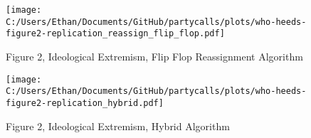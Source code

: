 \documentclass[12pt]{article}
\begin{document}
\begin{figure}[h]
	\caption{Figure 2, Ideological Extremism, Flip Flop Reassignment Algorithm}
	\centering
	\texttt{[image: C:/Users/Ethan/Documents/GitHub/partycalls/plots/who-heeds-figure2-replication\_reassign\_flip\_flop.pdf]}
	
\end{figure}

\begin{figure}[h]
	\caption{Figure 2, Ideological Extremism, Hybrid Algorithm}
	\centering
	\texttt{[image: C:/Users/Ethan/Documents/GitHub/partycalls/plots/who-heeds-figure2-replication\_hybrid.pdf]}
	
\end{figure}
			
			
			
			
			
			
\end{document}
